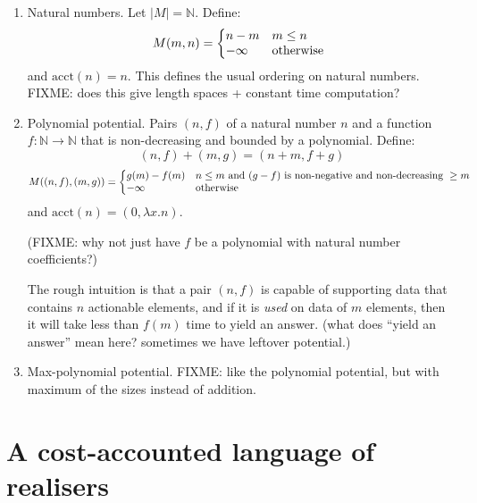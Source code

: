 \documentclass{workingnote}
\newcommand{\account}{\mathrm{acct}}
\begin{document}
\begin{enumerate}
\item Natural numbers. Let $|M| = \mathbb{N}$. Define:
  \begin{displaymath}
    M(m,n) = \left\{\begin{array}{@{}ll} n-m & m \leq n \\ -\infty & \textrm{otherwise} \end{array}\right.
  \end{displaymath}
  and $\account(n) = n$. This defines the usual ordering on natural
  numbers. FIXME: does this give length spaces + constant time
  computation?
\item Polynomial potential. Pairs $(n,f)$ of a natural number $n$ and
  a function $f : \mathbb{N} \to \mathbb{N}$ that is non-decreasing
  and bounded by a polynomial. Define:
  \begin{displaymath}
    (n,f)+(m,g) = (n+m,f+g)
  \end{displaymath}
  \begin{displaymath}
    M((n,f),(m,g)) = \left\{\begin{array}{@{}ll}
                              g(m) - f(m) & n \leq m\textrm{ and }(g-f)\textrm{ is non-negative and non-decreasing }\geq m \\
                              -\infty      & \textrm{otherwise}
                            \end{array}
                          \right.
  \end{displaymath}
  and $\account(n) = (0,\lambda x.n)$.

  (FIXME: why not just have $f$ be a polynomial with natural number
  coefficients?)

  The rough intuition is that a pair $(n,f)$ is capable of supporting
  data that contains $n$ actionable elements, and if it is \emph{used}
  on data of $m$ elements, then it will take less than $f(m)$ time to
  yield an answer. (what does ``yield an answer'' mean here? sometimes
  we have leftover potential.)
\item Max-polynomial potential. FIXME: like the polynomial potential,
  but with maximum of the sizes instead of addition.
\end{enumerate}

\section{A cost-accounted language of realisers}
\end{document}
